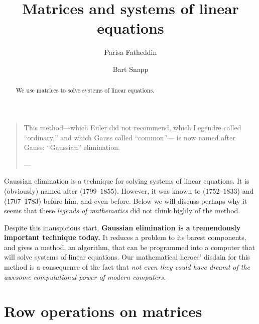 \documentclass{ximera}
\author{Parisa Fatheddin \and Bart Snapp}
\title{Matrices and systems of linear equations}
\begin{document}
\begin{abstract}
  We use matrices to solve systems of linear equations.
\end{abstract}
\maketitle

\begin{quote}
  This method---which Euler did not recommend, which Legendre called ``ordinary,'' and which Gauss called ``common''--- is now named after Gauss: ``Gaussian'' elimination.

  
\hfill ---
\end{quote}
  
Gaussian elimination is a technique for solving systems of linear
equations. It is (obviously) named after
($1799$--$1855$). However, it was known to
($1752$--$1833$) and
($1707$--$1783$) before him, and even before. Below we will discuss
perhaps why it seems that these \textit{legends of mathematics} did
not think highly of the method.






Despite this inauspicious start, \textbf{Gaussian elimination is a
  tremendously important technique today.} It reduces a problem to
its barest components, and gives a method, an algorithm, that can be
programmed into a computer that will solve systems of linear
equations. Our mathematical heroes' disdain for this method is a
consequence of the fact that \textit{not even they could have dreamt of the awesome
computational power of modern computers.}



\section{Row operations on matrices}
\end{document}
